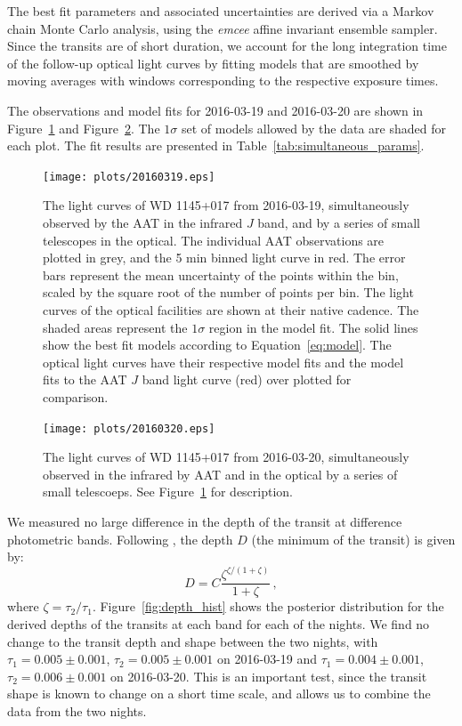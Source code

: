 \documentclass[iop,useAMES,usenatbig]{emulateapj}
\begin{document}
The best fit parameters and associated uncertainties are derived via a Markov chain Monte Carlo analysis, using the \emph{emcee} \citep{2013PASP..125..306F} affine invariant ensemble sampler. Since the transits are of short duration, we account for the long integration time of the follow-up optical light curves by fitting models that are smoothed by moving averages with windows corresponding to the respective exposure times. 

The observations and model fits for 2016-03-19 and 2016-03-20 are shown in Figure~\ref{fig:lc_20160319} and Figure~\ref{fig:lc_20160320}. The $1\sigma$ set of models allowed by the data are shaded for each plot. The fit results are presented in Table~\ref{tab:simultaneous_params}. 

\begin{figure}
    \centering
    \texttt{[image: plots/20160319.eps]}
    \caption{The light curves of WD 1145+017 from 2016-03-19, simultaneously observed by the AAT in the infrared $J$ band, and by a series of small telescopes in the optical. The individual AAT observations are plotted in grey, and the 5 min binned light curve in red. The error bars represent the mean uncertainty of the points within the bin, scaled by the square root of the number of points per bin. The light curves of the optical facilities are shown at their native cadence. The shaded areas represent the $1\sigma$ region in the model fit. The solid lines show the best fit models according to Equation~\ref{eq:model}. The optical light curves have their respective model fits and the model fits to the AAT $J$ band light curve (red) over plotted for comparison.}
    \label{fig:lc_20160319}
\end{figure}

\begin{figure}
    \centering
    \texttt{[image: plots/20160320.eps]}
    \caption{The light curves of WD 1145+017 from 2016-03-20, simultaneously observed in the infrared by AAT and in the optical by a series of small telescoeps. See Figure~\ref{fig:lc_20160319} for description.}
    \label{fig:lc_20160320}
\end{figure}

We measured no large difference in the depth of the transit at difference photometric bands. Following \citet{2015arXiv151006434C}, the depth $D$ (the minimum of the transit) is given by: 
\begin{equation}
D = C \frac{\zeta^{\zeta/(1+\zeta)} }{1+\zeta}\,,
\end{equation}
where $\zeta = \tau_2/\tau_1$. Figure~\ref{fig:depth_hist} shows the posterior distribution for the derived depths of the transits at each band for each of the nights. We find no change to the transit depth and shape between the two nights, with $\tau_1 = 0.005\pm0.001$, $\tau_2 = 0.005\pm0.001$ on 2016-03-19 and $\tau_1 = 0.004\pm0.001$, $\tau_2 = 0.006\pm0.001$ on 2016-03-20. This is an important test, since the transit shape is known to change on a short time scale, and allows us to combine the data from the two nights. 
\end{document}
